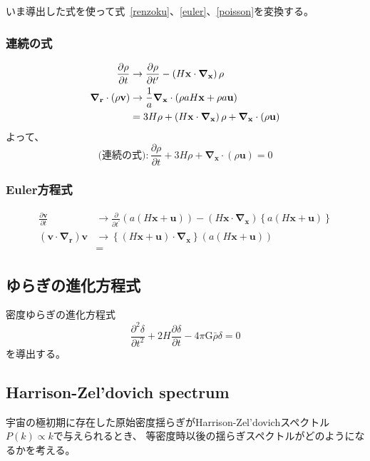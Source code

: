 \documentclass[a4paper,papersize,uplatex,dvipdfmx,10pt]{jsarticle}
\begin{document}
いま導出した式を使って式~\eqref{renzoku}、\eqref{euler}、\eqref{poisson}を変換する。
\subsubsection{連続の式}
\begin{align}
  \frac{\partial \rho}{\partial t} &\to \frac{\partial \rho}{\partial t^{\prime}} - \left( H\mathbf{x}\cdot\bm{\nabla}_{\mathbf{x}}\right)\rho\\
  \bm{\nabla}_{\mathbf{r}}\cdot\left( \rho \mathbf{v} \right) &\to \frac{1}{a}\bm{\nabla}_{\mathbf{x}}\cdot\left( \rho aH\mathbf{x} + \rho a\mathbf{u} \right)\notag\\
  &= 3H\rho + \left( H\mathbf{x}\cdot\bm{\nabla}_{\mathbf{x}}\right)\rho + \bm{\nabla}_{\mathbf{x}} \cdot \left( \rho\mathbf{u} \right)
\end{align}
よって、
\begin{equation}
  \text{(連続の式)}: \frac{\partial \rho}{\partial t} + 3H\rho + \bm{\nabla}_{\mathbf{x}} \cdot \left( \rho\mathbf{u} \right) = 0
\end{equation}

\subsubsection{Euler方程式}
\begin{align}
  \frac{\partial \mathbf{v}}{\partial t} &\to \frac{\partial}{\partial t^{\prime}}\left( a\left( H\mathbf{x}+\mathbf{u} \right) \right) - \left( H\mathbf{x}\cdot\bm{\nabla}_{\mathbf{x}} \right)\left\{ a\left( H\mathbf{x}+\mathbf{u} \right) \right\}\\
  \left( \mathbf{v}\cdot\bm{\nabla}_{\mathbf{r}} \right)\mathbf{v} &\to \left\{ \left( H\mathbf{x}+\mathbf{u} \right)\cdot\bm{\nabla}_{\mathbf{x}} \right\}\left( a\left( H\mathbf{x}+\mathbf{u} \right) \right)\\
  &=
\end{align}


\subsection{ゆらぎの進化方程式}
密度ゆらぎの進化方程式
\begin{equation}
  \frac{\partial^{2} \delta}{\partial t^{2}}+2H\frac{\partial \delta}{\partial t}-4\pi\mathrm{G}\bar{\rho}\delta=0
\end{equation}
を導出する。

\subsection{Harrison-Zel'dovich spectrum}
宇宙の極初期に存在した原始密度揺らぎがHarrison-Zel’dovichスペクトル$P(k) \propto k$で与えられるとき、 等密度時以後の揺らぎスペクトルがどのようになるかを考える。
\end{document}
